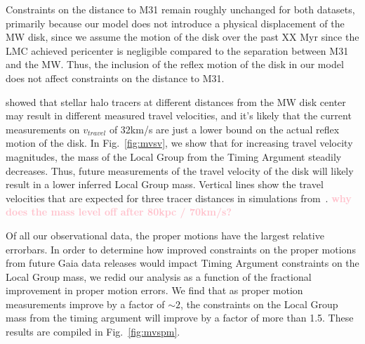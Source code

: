 \documentclass[twocolumn]{aastex631}
\newcommand{\kc}[1]{\textcolor{pink}{\textbf{#1}} }
\begin{document}
Constraints on the distance to M31 remain roughly unchanged for both datasets, primarily because our model does not introduce a physical displacement of the MW disk, since we assume the motion of the disk over the past XX Myr since the LMC achieved pericenter is negligible compared to the separation between M31 and the MW. Thus, the inclusion of the reflex motion of the disk in our model does not affect constraints on the distance to M31.


\cite{Garavito-Camargo2021b} showed that stellar halo tracers at different distances from the MW disk center may result in different measured travel velocities, and it's likely that the current measurements on $v_{travel}$ of 32km/s are just a lower bound on the actual reflex motion of the disk. In Fig.~\ref{fig:mvsv}, we show that for increasing travel velocity magnitudes, the mass of the Local Group from the Timing Argument steadily decreases. Thus, future measurements of the travel velocity of the disk will likely result in a lower inferred Local Group mass. Vertical lines show the travel velocities that are expected for three tracer distances in simulations from~\cite{Garavito-Camargo2021b}. \kc{why does the mass level off after 80kpc / 70km/s? }

Of all our observational data, the proper motions have the largest relative errorbars. In order to determine how improved constraints on the proper motions from future Gaia data releases would impact Timing Argument constraints on the Local Group mass, we redid our analysis as a function of the fractional improvement in proper motion errors.
We find that as proper motion measurements improve by a factor of $\sim2$, the constraints on the Local Group mass from the timing argument will improve by a factor of more than 1.5. These results are compiled in Fig.~\ref{fig:mvspm}.
\end{document}
